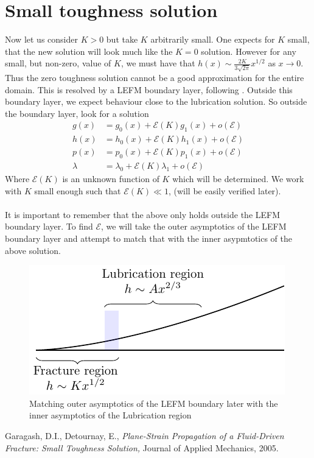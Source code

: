 \documentclass{article}
\newcommand{\cE}{\mathcal{E}}                               %
\begin{document}
\section{Small toughness solution}
Now let us consider $K>0$ but take $K$ arbitrarily small. One expects for 
$K$ small, that the new solution will look much like the $K=0$ solution.
However for any small, but non-zero, value of $K$, we must have that
$h(x) \sim \frac{2K}{3\sqrt{2\pi}}x^{1/2}$ as $x\to0$. Thus the zero toughness
solution cannot be a good approximation for the entire domain. This is 
resolved by a LEFM boundary layer, following \cite{GandD}.
Outside this boundary layer, we expect behaviour close to the lubrication 
solution. So outside the boundary layer, look for a solution
\begin{align*}
g(x) &= g_0(x) + \cE(K)g_1(x)+o(\cE) \\
h(x) &= h_0(x) + \cE(K)h_1(x)+o(\cE) \\
p(x) &= p_0(x) + \cE(K)p_1(x)+o(\cE) \\
\lambda &= \lambda_0 + \cE(K)\lambda_1+o(\cE) 
\end{align*}
Where $\cE(K)$ is an unknown function of $K$ which will be determined.
We work with $K$ small enough such that $\cE(K) \ll 1$, (will be easily
verified later).
\\
\\
It is important to remember that the above only holds outside the LEFM boundary
layer. To find $\cE$, we will take the outer asymptotics of the LEFM boundary
layer and attempt to match that with the inner asypmtotics of the above 
solution.

\begin{figure}[!ht]\centering
\caption{Matching outer asymptotics of the LEFM boundary later with the inner
asymptotics of the Lubrication region}
\includegraphics{Fig6.pdf}
\end{figure}


%
%
\clearpage 
\begin{thebibliography}{9}  
%
Garagash, D.I., Detournay, E.,
\emph{Plane-Strain Propagation of a Fluid-Driven Fracture: Small Toughness
Solution,}
Journal of Applied Mechanics,
2005.
%
%
\end{thebibliography}
\end{document}
